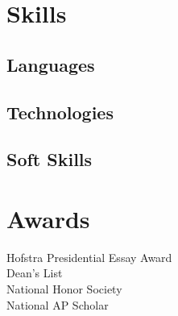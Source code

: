 \documentclass[]{deedy-resume-openfont}
\begin{document}
\begin{minipage}[t]{0.33\textwidth}

\section{Skills}
\subsection{Languages}
\cvtag{\LaTeX}  

\vspace{\topsep}
\subsection{Technologies}

\vspace{\topsep}
\subsection{Soft Skills}
\sectionsep

\section{Awards}
Hofstra Presidential Essay Award \\
Dean's List \\
National Honor Society \\
National AP Scholar

\end{minipage} 
\end{document}
